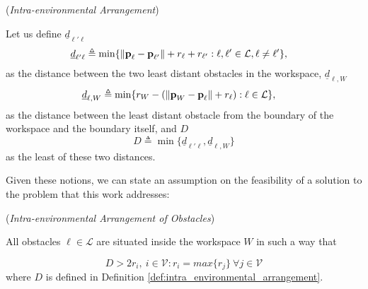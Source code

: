 \begin{bw_box}
\begin{definition} (\textit{Intra-environmental Arrangement})

  Let us define $\underline{d}_{\ell'\ell}$
  \begin{align}
    \underline{d}_{\ell'\ell} &\triangleq \min\{\| \bm{\mathbf{p}}_{\ell} - \bm{\mathbf{p}}_{\ell'}\| + r_{\ell} + r_{\ell'} :
      \ell,\ell' \in \mathcal{L}, \ell \neq \ell' \},
  \end{align}
  as the distance between the two least distant obstacles in the workspace,
  $\underline{d}_{\ell,W}$
  \begin{align}
    \underline{d}_{\ell,W} & \triangleq \min\{r_W - (\|\bm{\mathbf{p}}_W - \bm{\mathbf{p}}_{\ell}\| + r_{\ell}) : \ell \in \mathcal{L}\},
  \end{align}
  as the distance between the least distant obstacle from the boundary of the
  workspace and the boundary itself, and $D$
  \begin{equation}
    D \triangleq \min\{\underline{d}_{\ell'\ell}, \underline{d}_{\ell,W}\}
  \end{equation}
  as the least of these two distances.
\label{def:intra_environmental_arrangement}
\end{definition}
\end{bw_box}
Given these notions, we can state an assumption on the feasibility of a
solution to the problem that this work addresses:

\begin{gg_box}
  \begin{assumption}(\textit{Intra-environmental Arrangement of Obstacles})

    All obstacles $\ell \in \mathcal{L}$ are situated inside the workspace $W$
    in such a way that

  \begin{equation}
    D > 2 r_i,\ i \in \mathcal{V} : r_i = max\{r_j\}\ \forall j \in \mathcal{V}
  \label{eq:geometric_constraint}
  \end{equation}
  where $D$ is defined in Definition \eqref{def:intra_environmental_arrangement}.
\label{ass:intra_environmental_arrangement}
\end{assumption}
\end{gg_box}
